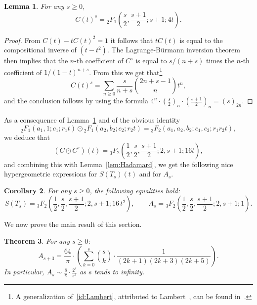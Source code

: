 \documentclass[12pt]{amsart}
\newcommand{\revision}[1]{{#1}}
\theoremstyle{plain}
\newtheorem{lemma}{Lemma}
\newtheorem{theorem}[lemma]{Theorem}
\newtheorem{corollary}[lemma]{Corollary}
\theoremstyle{remark}
\begin{document}
\begin{lemma}\label{lem:HypergeomCats}
For any \revision{$s\geq 0$}, 
\[ 
C(t)^s = {}_{2}^{}{{}{{}{F_{1}^{}}}} \left(\frac{s}{2}, \frac{s+1}{2}; s+1; 4t \right) .
\]
\end{lemma}

\begin{proof}
From $C(t) - t C(t)^2 = 1$ it follows that $t C(t)$ is equal to the compositional inverse of $(t-t^2)$. The Lagrange-Bürmann inversion theorem then implies that the $n$-th coefficient of $C^s$ is equal to $s/(n+s)$ times the $n$-th coefficient of $1/(1-t)^{n+s}$. From this we get that\footnote{A generalization of~\eqref{id:Lambert}, attributed to Lambert~\cite{Lambert1770}, can be found in~\cite[\revision{Eq.~(5.60), p.~201}]{GKP94}.} 
\begin{equation}\label{id:Lambert}
	 C(t)^s = \sum_{n\geq 0} \frac{s}{n+s} \binom{2n+s-1}{n} t^n ,
\end{equation}	 
and the conclusion follows by using the formula $4^n \cdot \left(\frac{s}{2} \right)_n \cdot \left(\frac{s+1}{2} \right)_n = (s)_{2n}$.
\end{proof}

As a consequence of Lemma~\ref{lem:HypergeomCats} and of the obvious identity 
\[
 {}_{2}^{}{{}{{}{F_{1}^{}}}} \left(a_1, 1; c_1; r_1 t \right)
 \odot
 {}_{2}^{}{{}{{}{F_{1}^{}}}} \left(a_2, b_2; c_2; r_2 t \right)
 =
 {}_{3}^{}{{}{{}{F_{2}^{}}}} \left(a_1, a_2, b_2; c_1, c_2; r_1 r_2 t \right),
\]
we deduce that
\[
(C\odot C^s) (t) = {}_{3}^{}{{}{{}{F_{2}^{}}}} \left(\frac{1}{2},\frac{s}{2},\frac{s+1}{2};2,s +1;16 t \right) ,
\]
and combining this with Lemma~\ref{lem:Hadamard}, we get the following nice hypergeometric \revision{expressions for $S(T_s)(t)$ and for $A_s$}.
\begin{corollary} \label{coro:3F2}
For any \revision{$s\geq 0$},
the following equalities hold:
\begin{equation} \label{eq:As=3F2}
\revision{S(T_s)= {}_{3}^{}{{}{{}{F_{2}^{}}}} \left(\frac{1}{2},\frac{s}{2},\frac{s+1}{2};2,s +1; 16 \, t^2\right),}\qquad A_s = {}_{3}^{}{{}{{}{F_{2}^{}}}} \left(\frac{1}{2},\frac{s}{2},\frac{s+1}{2};2,s +1;1 \right) .
\end{equation}
\end{corollary}


We now prove the main result of this section.
\begin{theorem}\label{thm:stars}
For any $s\geq 0$:
\[A_{s + 3}  = 
\frac{64}{\pi} \cdot \left(
\sum_{k=0}^s   {\binom{s}{k}} \cdot \frac{1}{\left(2 k +1\right) \left(2 k +3\right) \left(2 k +5\right)}\right) .
\]	
In particular,  $A_s \sim\frac{8}{\pi} \cdot \frac{2^s}{s^3}$ as $s$ tends to infinity.
\end{theorem}
\end{document}
